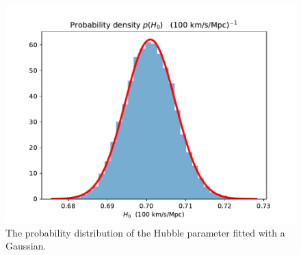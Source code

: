 \documentclass{aa}
\begin{document}
\begin{figure}[H]
   \includegraphics[scale=0.6]{../figures/milestone1/prob_dist_H0.pdf}
   \caption{The probability distribution of the Hubble parameter fitted with a Gaussian.}\label{fig:M1_prob_dist}
\end{figure}
\end{document}

